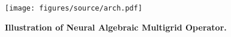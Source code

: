 \begin{figure}
    \centering
    \texttt{[image: figures/source/arch.pdf]}
    \vspace{-10pt}
    \caption{\textbf{Illustration of Neural Algebraic Multigrid Operator.}}
    \label{fig:arch}
\end{figure}